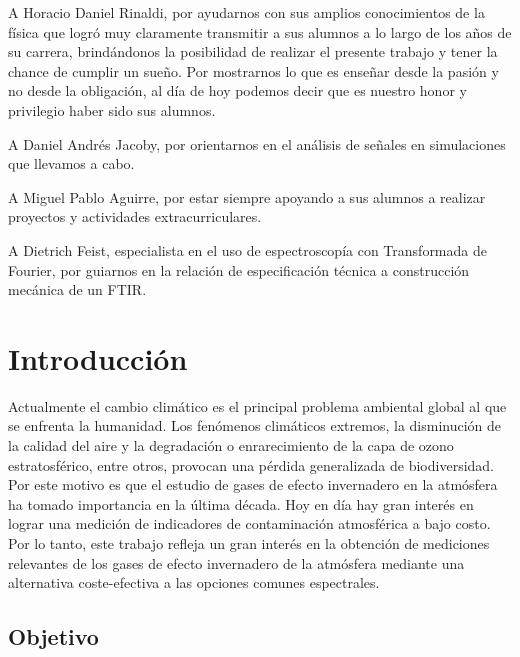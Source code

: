 \documentclass[11pt,titlepage]{article}
\begin{document}
A Horacio Daniel Rinaldi, por ayudarnos con sus amplios conocimientos de la física que logró muy claramente transmitir a sus alumnos a lo largo de los años de su carrera, brindándonos la posibilidad de realizar el presente trabajo y tener la chance de cumplir un sueño. Por mostrarnos lo que es enseñar desde la pasión y no desde la obligación, al día de hoy podemos decir que es nuestro honor y privilegio haber sido sus alumnos.\\\par

A Daniel Andr\'es Jacoby, por orientarnos en el an\'alisis de señales en simulaciones que llevamos a cabo.\\\par

A Miguel Pablo Aguirre, por estar siempre apoyando a sus alumnos a realizar proyectos y actividades extracurriculares.\\\par %

A Dietrich Feist, especialista en el uso de espectroscopía con Transformada de Fourier,  por guiarnos en la relación de especificación técnica a construcción mecánica de un FTIR.


\newpage

\tableofcontents
\newpage



\section{Introducción}
Actualmente el cambio clim\'atico es el principal problema ambiental global al que se enfrenta la humanidad. Los fenómenos climáticos extremos, la disminución de la calidad del aire y la degradación o enrarecimiento de la capa de ozono estratosférico, entre otros, provocan una pérdida generalizada de biodiversidad. Por este motivo es que el estudio de gases de efecto invernadero en la atmósfera ha tomado importancia en la última década. Hoy en día hay gran interés en lograr una medición de indicadores de contaminación atmosférica a bajo costo. Por lo tanto, este trabajo refleja un gran interés en la obtención de mediciones relevantes de los gases de efecto invernadero de la atmósfera mediante una alternativa coste-efectiva a las opciones comunes espectrales.\\

\subsection{Objetivo}
\end{document}
